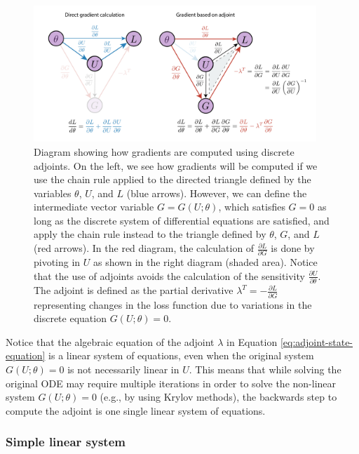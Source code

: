 \begin{figure}[t]
    \centering
    \includegraphics[width=0.95\textwidth]{figures/discrete_adjoint.pdf}
    \caption{Diagram showing how gradients are computed using discrete adjoints. On the left, we see how gradients will be computed if we use the chain rule applied to the directed triangle defined by the variables $\theta$, $U$, and $L$ (blue arrows). However, we can define the intermediate vector variable $G = G(U; \theta)$, which satisfies $G  = 0$ as long as the discrete system of differential equations are satisfied, and apply the chain rule instead to the triangle defined by $\theta$, $G$, and $L$ (red arrows). In the red diagram, the calculation of $\frac{\partial L}{\partial G}$ is done by pivoting in $U$ as shown in the right diagram (shaded area). Notice that the use of adjoints avoids the calculation of the sensitivity $\frac{\partial U}{\partial \theta}$. The adjoint is defined as the partial derivative $\lambda^T = - \frac{\partial L}{\partial G}$ representing changes in the loss function due to variations in the discrete equation $G(U; \theta) = 0$. 
    }
    \label{fig:discrete-adjoint}
\end{figure}

Notice that the algebraic equation of the adjoint $\lambda$ in Equation \eqref{eq:adjoint-state-equation} is a linear system of equations, even when the original system $G(U; \theta)=0$ is not necessarily linear in $U$.
This means that while solving the original ODE may require multiple iterations in order to solve the non-linear system $G(U; \theta) = 0$ (e.g., by using Krylov methods), the backwards step to compute the adjoint is one single linear system of equations. 

\subsubsection{Simple linear system}

